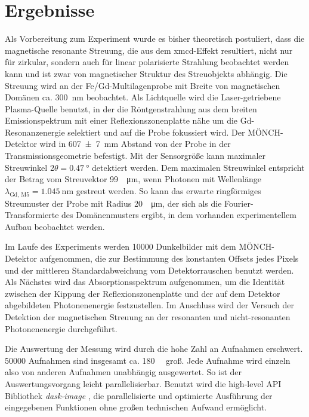 \chapter{Ergebnisse}
\label{text:auswertung}
Als Vorbereitung zum Experiment wurde es bisher theoretisch postuliert, dass die magnetische resonante Streuung, die aus dem \gls{xmcd}-Effekt resultiert, nicht nur für zirkular, sondern auch für linear polarisierte Strahlung beobachtet werden kann und ist zwar von magnetischer Struktur des Streuobjekts abhängig. Die Streuung wird an der Fe/Gd-Multilagenprobe mit Breite von magnetischen Domänen ca. \SI{300}{\nano\meter} beobachtet. Als Lichtquelle wird die Laser-getriebene Plasma-Quelle benutzt, in der die Röntgenstrahlung aus dem breiten Emissionspektrum mit einer Reflexionszonenplatte nähe um die Gd-Resonanzenergie selektiert und auf die Probe fokussiert wird. Der MÖNCH-Detektor wird in \SI{607(7)}{\milli\meter} Abstand von der Probe in der Transmissionsgeometrie befestigt. Mit der  Sensorgröße kann maximaler Streuwinkel $2\theta = \SI{0.47}{\degree}$ detektiert werden. Dem maximalen Streuwinkel entspricht der Betrag vom Streuvektor \SI{99}{\per\micro\meter}, wenn Photonen mit Wellenlänge $\lambda_\text{Gd, M5} = \SI{1.045}{\nano\meter}$ gestreut werden. So kann das erwarte ringförmiges Streumuster der Probe mit Radius \SI{20}{\per\micro\meter}, der sich als die Fourier-Transformierte des Domänenmusters ergibt, in dem vorhanden experimentellem Aufbau beobachtet werden.

\noindent
Im Laufe des Experiments werden \num{10000} Dunkelbilder mit dem MÖNCH-Detektor aufgenommen, die zur Bestimmung des konstanten Offsets jedes Pixels und der mittleren Standardabweichung vom Detektorrauschen benutzt werden. Als Nächstes wird das Absorptionsspektrum aufgenommen, um die Identität zwischen der Kippung der Reflexionszonenplatte und der auf dem Detektor abgebildeten Photonenenergie festzustellen. Im Anschluss wird der Versuch der Detektion der magnetischen Streuung an der resonanten und nicht-resonanten Photonenenergie durchgeführt.   

\noindent
Die Auswertung der Messung wird durch die hohe Zahl an Aufnahmen erschwert. \num{50000} Aufnahmen sind insgesamt ca. \qty{180}{\giga\byte} groß. Jede Aufnahme wird einzeln also von anderen Aufnahmen unabhängig ausgewertet. So ist der Auswertungsvorgang leicht parallelisierbar. Benutzt wird die high-level API Bibliothek \textit{dask-image} \cite{dask-library}, die parallelisierte und optimierte Ausführung der eingegebenen Funktionen ohne großen technischen Aufwand ermöglicht.


